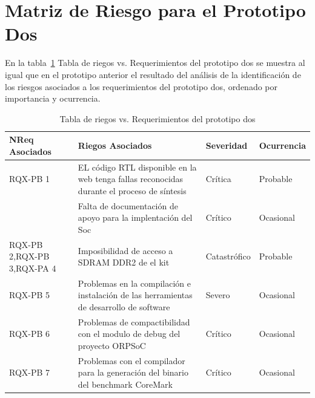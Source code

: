 		\section{Matriz de Riesgo para el Prototipo Dos} 
En la tabla~\ref{tab:riegos2} Tabla de riegos vs. Requerimientos del prototipo dos se muestra al igual que en el prototipo anterior el resultado del análisis de la identificación de los riesgos asociados a los requerimientos del prototipo dos, ordenado por importancia y ocurrencia.
		\begin{table}[h!]
		\centering
		\begin{tabular}{ p{2.5cm} p{9cm} p{1.5cm} p{2cm} }
		\hline 
		\rowcolor[gray]{0.8} N\textordmasculine Req Asociados& Riegos Asociados & Severidad  & Ocurrencia \\
		\hline
		RQX-PB 1& EL código RTL disponible en la web tenga fallas reconocidas durante el proceso de síntesis & Crítica       & Probable \\
		\hline				
				& Falta de documentación de apoyo para la implentación
del Soc & Crítico & Ocasional\\	 
		\hline
		RQX-PB 2,RQX-PB 3,RQX-PA 4 & Imposibilidad de acceso a SDRAM DDR2 de el kit& Catastrófico & Probable\\
		\hline
		RQX-PB 5&Problemas en la compilación e instalación de las herramientas de desarrollo de software  & Severo  &  Ocasional\\ 
		\hline
		RQX-PB 6& Problemas de compactibilidad con el modulo de debug del proyecto ORPSoC  & Crítico&  Ocasional\\
		\hline
		RQX-PB 7 & Problemas con el compilador para la generación del binario del benchmark CoreMark  & Crítico&  Ocasional\\
		\hline
		\end{tabular}
		\caption{Tabla de riegos vs. Requerimientos del prototipo dos}
		\label{tab:riegos2}
		\end{table}

